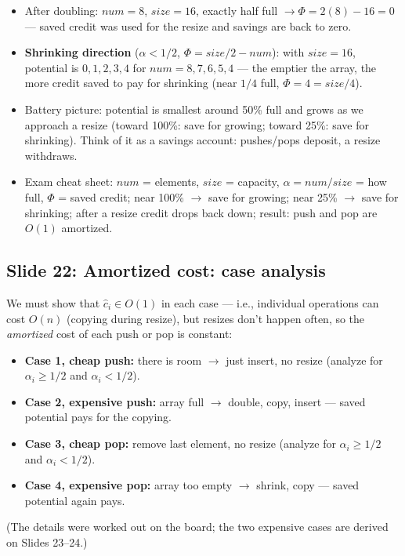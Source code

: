 \documentclass[11pt]{article}
\newcommand{\slide}[2]{\subsection*{Slide #1: #2}}
\begin{document}
\begin{itemize}
  \item After doubling: $num = 8$, $size = 16$, exactly half full $\to \Phi = 2(8) - 16 = 0$ --- saved credit was used for the resize and savings are back to zero.
  \item \textbf{Shrinking direction} ($\alpha < 1/2$, $\Phi = size/2 - num$): with $size = 16$, potential is $0, 1, 2, 3, 4$ for $num = 8, 7, 6, 5, 4$ --- the emptier the array, the more credit saved to pay for shrinking (near $1/4$ full, $\Phi = 4 = size/4$).
  \item Battery picture: potential is smallest around 50\% full and grows as we approach a resize (toward 100\%: save for growing; toward 25\%: save for shrinking). Think of it as a savings account: pushes/pops deposit, a resize withdraws.
  \item Exam cheat sheet: $num$ = elements, $size$ = capacity, $\alpha = num/size$ = how full, $\Phi$ = saved credit; near 100\% $\to$ save for growing; near 25\% $\to$ save for shrinking; after a resize credit drops back down; result: push and pop are $O(1)$ amortized.
\end{itemize}

\slide{22}{Amortized cost: case analysis}
We must show that $\hat{c}_i \in O(1)$ in each case --- i.e., individual operations can cost $O(n)$ (copying during resize), but resizes don't happen often, so the \emph{amortized} cost of each push or pop is constant:
\begin{itemize}
  \item \textbf{Case 1, cheap push:} there is room $\to$ just insert, no resize (analyze for $\alpha_i \ge 1/2$ and $\alpha_i < 1/2$).
  \item \textbf{Case 2, expensive push:} array full $\to$ double, copy, insert --- saved potential pays for the copying.
  \item \textbf{Case 3, cheap pop:} remove last element, no resize (analyze for $\alpha_i \ge 1/2$ and $\alpha_i < 1/2$).
  \item \textbf{Case 4, expensive pop:} array too empty $\to$ shrink, copy --- saved potential again pays.
\end{itemize}
(The details were worked out on the board; the two expensive cases are derived on Slides 23--24.)
\end{document}
